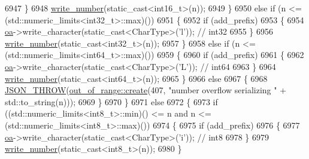 \begin{DoxyCode}
6947                 \}
6948                 \hyperlink{classnlohmann_1_1detail_1_1binary__writer_a62cfd50a511371e718f37ad7bb29ae9d}{write\_number}(static\_cast<int16\_t>(n));
6949             \}
6950             \textcolor{keywordflow}{else} \textcolor{keywordflow}{if} (n <= (std::numeric\_limits<int32\_t>::max)())
6951             \{
6952                 \textcolor{keywordflow}{if} (add\_prefix)
6953                 \{
6954                     \hyperlink{classnlohmann_1_1detail_1_1binary__writer_a6f15b782a7900f50ef37d123008e601b}{oa}->write\_character(static\_cast<CharType>(\textcolor{charliteral}{'l'}));  \textcolor{comment}{// int32}
6955                 \}
6956                 \hyperlink{classnlohmann_1_1detail_1_1binary__writer_a62cfd50a511371e718f37ad7bb29ae9d}{write\_number}(static\_cast<int32\_t>(n));
6957             \}
6958             \textcolor{keywordflow}{else} \textcolor{keywordflow}{if} (n <= (std::numeric\_limits<int64\_t>::max)())
6959             \{
6960                 \textcolor{keywordflow}{if} (add\_prefix)
6961                 \{
6962                     \hyperlink{classnlohmann_1_1detail_1_1binary__writer_a6f15b782a7900f50ef37d123008e601b}{oa}->write\_character(static\_cast<CharType>(\textcolor{charliteral}{'L'}));  \textcolor{comment}{// int64}
6963                 \}
6964                 \hyperlink{classnlohmann_1_1detail_1_1binary__writer_a62cfd50a511371e718f37ad7bb29ae9d}{write\_number}(static\_cast<int64\_t>(n));
6965             \}
6966             \textcolor{keywordflow}{else}
6967             \{
6968                 \hyperlink{json_8hpp_a6c274f6db2e65c1b66c7d41b06ad690f}{JSON\_THROW}(\hyperlink{classnlohmann_1_1detail_1_1out__of__range_a3f6d82a6f967c4728a1ec735a7867073}{out\_of\_range::create}(407, \textcolor{stringliteral}{"number overflow
       serializing "} + std::to\_string(n)));
6969             \}
6970         \}
6971         \textcolor{keywordflow}{else}
6972         \{
6973             \textcolor{keywordflow}{if} ((std::numeric\_limits<int8\_t>::min)() <= n and n <= (std::numeric\_limits<int8\_t>::max)())
6974             \{
6975                 \textcolor{keywordflow}{if} (add\_prefix)
6976                 \{
6977                     \hyperlink{classnlohmann_1_1detail_1_1binary__writer_a6f15b782a7900f50ef37d123008e601b}{oa}->write\_character(static\_cast<CharType>(\textcolor{charliteral}{'i'}));  \textcolor{comment}{// int8}
6978                 \}
6979                 \hyperlink{classnlohmann_1_1detail_1_1binary__writer_a62cfd50a511371e718f37ad7bb29ae9d}{write\_number}(static\_cast<int8\_t>(n));
6980             \}

\end{DoxyCode}
